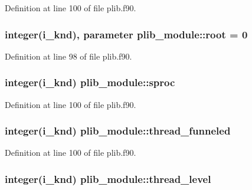Definition at line 100 of file plib.\-f90.

\hypertarget{classplib__module_a4216863984e9df981d4a2d5a51020ce5}{
\subsubsection[{root}]{\setlength{\rightskip}{0pt plus 5cm}integer(i\-\_\-knd), parameter plib\-\_\-module\-::root = 0}}\label{classplib__module_a4216863984e9df981d4a2d5a51020ce5}


Definition at line 98 of file plib.\-f90.

\hypertarget{classplib__module_aa3b6e5883dfa628f71771e9e6ee3e722}{
\subsubsection[{sproc}]{\setlength{\rightskip}{0pt plus 5cm}integer(i\-\_\-knd) plib\-\_\-module\-::sproc}}\label{classplib__module_aa3b6e5883dfa628f71771e9e6ee3e722}


Definition at line 100 of file plib.\-f90.

\hypertarget{classplib__module_aaf61faf216e801843c4b8121eab84956}{
\subsubsection[{thread\-\_\-funneled}]{\setlength{\rightskip}{0pt plus 5cm}integer(i\-\_\-knd) plib\-\_\-module\-::thread\-\_\-funneled}}\label{classplib__module_aaf61faf216e801843c4b8121eab84956}


Definition at line 100 of file plib.\-f90.

\hypertarget{classplib__module_a704c693732d15c474f76b340e3b1c54f}{
\subsubsection[{thread\-\_\-level}]{\setlength{\rightskip}{0pt plus 5cm}integer(i\-\_\-knd) plib\-\_\-module\-::thread\-\_\-level}}\label{classplib__module_a704c693732d15c474f76b340e3b1c54f}


